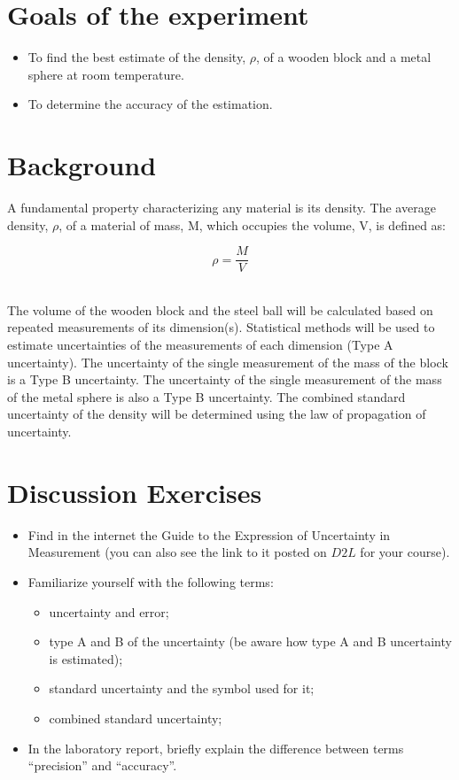 \section{Goals of the experiment}
\begin{itemize}
\item To find the best estimate of the density, $\rho$, of a wooden block and a metal sphere at room temperature.
\item To determine the accuracy of the estimation.
\end{itemize}
\section{Background}

A fundamental property characterizing any material is its density. The average density, $\rho$, of a material of mass, M, which occupies the volume, V, is defined as:

\begin{equation}\label{eq:densityqn}
{\rho}=\frac{M}{V}
\end{equation} 
\

The volume of the wooden block and the steel ball will be calculated based on repeated measurements of its dimension(s). Statistical methods will be used to estimate uncertainties of the measurements of each dimension (Type A uncertainty). The uncertainty of the single measurement of the mass of the block is a Type B uncertainty. The uncertainty of the single measurement of the mass of the metal sphere is also a Type B uncertainty. The combined standard uncertainty of the density will be determined using the law of propagation of uncertainty.



\section{Discussion Exercises}
\begin{itemize}
\item
Find in the internet the Guide to the Expression of Uncertainty in Measurement (you can also see the link to it posted on $D2L$ for your course).
\item
Familiarize yourself with the following terms: 
\begin{itemize}
\item uncertainty and error;
\item type A and B of the uncertainty (be aware how type A and B uncertainty is estimated);
\item standard uncertainty and the symbol used for it;
\item combined standard uncertainty;
\end{itemize}
\item In the laboratory report, briefly explain the difference between terms ``precision'' and ``accuracy''.
\end{itemize}


